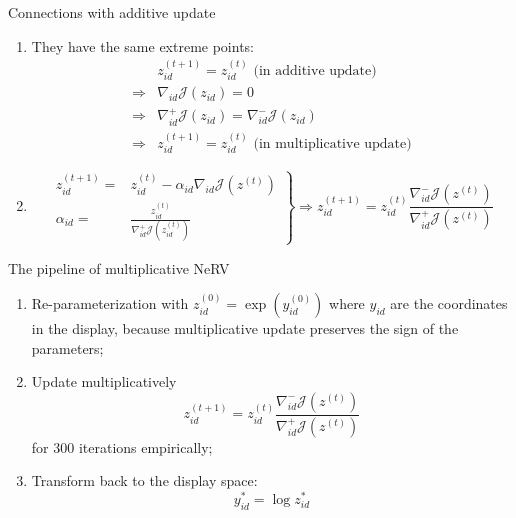 \documentclass[first=dgreen,second=purple,logo=yellowexc]{aaltoslides}
\begin{document}
\begin{frame}{Connections with additive update}
\begin{enumerate}
\item They have the same extreme points:
\begin{align*}
& z_{id}^{(t+1)}=z_{id}^{(t)} \mbox{ (in additive update)}\\
\Longrightarrow& \nabla_{id}\mathcal{J}(z_{id})=0\\
\Longrightarrow& \nabla_{id}^+\mathcal{J}(z_{id})=\nabla_{id}^-\mathcal{J}(z_{id})\\
\Longrightarrow& z_{id}^{(t+1)}=z_{id}^{(t)}\mbox{ (in multiplicative update)}
\end{align*}
\item
\[
\left.
\begin{aligned}
z^{(t+1)}_{id} =& z^{(t)}_{id}-\alpha_{id} \nabla_{id} \mathcal{J}(z^{(t)})\\
\alpha_{id} =& \frac{z_{id}^{(t)}}{\nabla_{id}^+\mathcal{J}(z_{id}^{(t)})}
\end{aligned}
\right\}\Longrightarrow z^{(t+1)}_{id}=z^{(t)}_{id}\frac{\nabla^-_{id} \mathcal{J}(z^{(t)})}{\nabla^+_{id} \mathcal{J}(z^{(t)})}
\]
\end{enumerate}
\end{frame}


\begin{frame}{The pipeline of multiplicative NeRV}
\begin{enumerate}
\item Re-parameterization with $z_{id}^{(0)}=\exp(y_{id}^{(0)})$ where $y_{id}$ are the coordinates in the display, because multiplicative update preserves the sign of the parameters;
\item Update multiplicatively
\[
z^{(t+1)}_{id}=z^{(t)}_{id}\frac{\nabla^-_{id} \mathcal{J}(z^{(t)})}{\nabla^+_{id} \mathcal{J}(z^{(t)})}
\]
for 300 iterations empirically;
\item Transform back to the display space:
\[
y_{id}^* =\log z^{*}_{id}
\]
\end{enumerate}
\end{frame}
\end{document}
